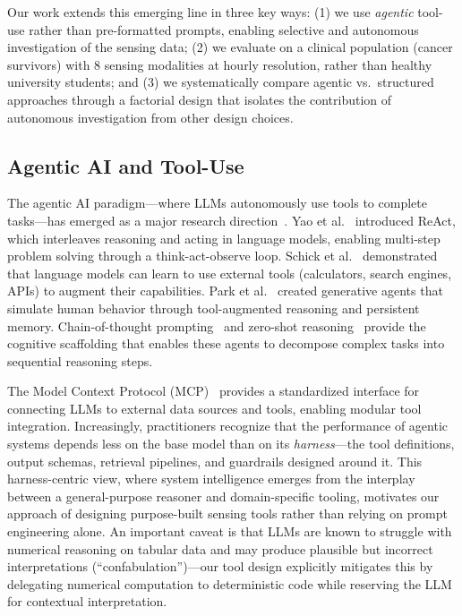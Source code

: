 \documentclass[screen,review,anonymous]{acmart}
\begin{document}
Our work extends this emerging line in three key ways: (1) we use \emph{agentic} tool-use rather than pre-formatted prompts, enabling selective and autonomous investigation of the sensing data; (2) we evaluate on a clinical population (cancer survivors) with 8 sensing modalities at hourly resolution, rather than healthy university students; and (3) we systematically compare agentic vs.\ structured approaches through a factorial design that isolates the contribution of autonomous investigation from other design choices.

\subsection{Agentic AI and Tool-Use}

The agentic AI paradigm---where LLMs autonomously use tools to complete tasks---has emerged as a major research direction~\cite{wang2024agent_survey, brown2020gpt3}. Yao et al.~\cite{yao2023react} introduced ReAct, which interleaves reasoning and acting in language models, enabling multi-step problem solving through a think-act-observe loop. Schick et al.~\cite{schick2024toolformer} demonstrated that language models can learn to use external tools (calculators, search engines, APIs) to augment their capabilities. Park et al.~\cite{park2023generative} created generative agents that simulate human behavior through tool-augmented reasoning and persistent memory. Chain-of-thought prompting~\cite{wei2022chain_of_thought} and zero-shot reasoning~\cite{kojima2022zero_shot} provide the cognitive scaffolding that enables these agents to decompose complex tasks into sequential reasoning steps.

The Model Context Protocol (MCP)~\cite{anthropic2024mcp} provides a standardized interface for connecting LLMs to external data sources and tools, enabling modular tool integration. Increasingly, practitioners recognize that the performance of agentic systems depends less on the base model than on its \emph{harness}---the tool definitions, output schemas, retrieval pipelines, and guardrails designed around it. This harness-centric view, where system intelligence emerges from the interplay between a general-purpose reasoner and domain-specific tooling, motivates our approach of designing purpose-built sensing tools rather than relying on prompt engineering alone. An important caveat is that LLMs are known to struggle with numerical reasoning on tabular data and may produce plausible but incorrect interpretations (``confabulation'')---our tool design explicitly mitigates this by delegating numerical computation to deterministic code while reserving the LLM for contextual interpretation.
\end{document}
